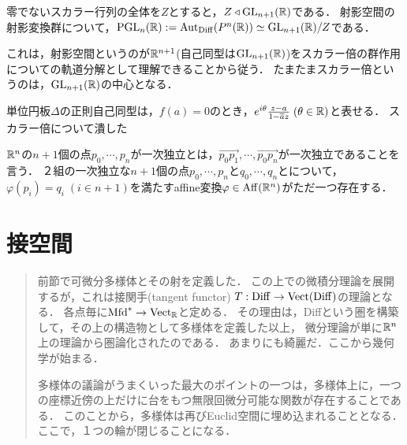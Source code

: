 \documentclass[uplatex,dvipdfmx]{jsreport}
\begin{document}
\begin{proposition}[射影変換群の構造]
    零でないスカラー行列の全体を$Z$とすると，$Z\triangleleft\mathrm{GL}_{n+1}(\mathbb{R})$である．
    射影空間の射影変換群について，$\mathrm{PGL}_n(\mathbb{R}):=\mathrm{Aut}_{\mathrm{Diff}}(P^n(\mathbb{R}))\simeq\mathrm{GL}_{n+1}(\mathbb{R})/Z$である．
\end{proposition}
\begin{remarks}
    これは，射影空間というのが$\mathbb{R}^{n+1}$(自己同型は$\mathrm{GL}_{n+1}(\mathbb{R})$)をスカラー倍の群作用についての軌道分解として理解できることから従う．
    たまたまスカラー倍というのは，$\mathrm{GL}_{n+1}(\mathbb{R})$の中心となる．

    単位円板$\Delta$の正則自己同型は，$f(a)=0$のとき，$e^{i\theta}\frac{z-a}{1-\overline{a}z}\;(\theta\in\mathbb{R})$と表せる．
    スカラー倍について潰した
\end{remarks}

\begin{proposition}[一次変換の推移性の一般化]
    $\mathbb{R}^n$の$n+1$個の点$p_0,\cdots,p_n$が一次独立とは，$\vec{p_0p_1},\cdots,\vec{p_0p_n}$が一次独立であることを言う．
    ２組の一次独立な$n+1$個の点$p_0,\cdots,p_n$と$q_0,\cdots,q_n$とについて，$\varphi(p_i)=q_i\;(i\in n+1)$を満たすaffine変換$\varphi\in\mathrm{Aff}(\mathbb{R}^n)$がただ一つ存在する．
\end{proposition}

\chapter{接空間}

\begin{quotation}
    前節で可微分多様体とその射を定義した．
    この上での微積分理論を展開するが，これは接関手(tangent functor) $T:\mathrm{Diff}\to\mathrm{Vect}(\mathrm{Diff})$の理論となる．
    各点毎に$\mathrm{Mfd}^*\to\mathrm{Vect}_{\mathbb{R}}$と定める．
    その理由は，Diffという圏を構築して，その上の構造物として多様体を定義した以上，
    微分理論が単に$\mathbb{R}^n$上の理論から圏論化されたのである．
    あまりにも綺麗だ．ここから幾何学が始まる．

    多様体の議論がうまくいった最大のポイントの一つは，多様体上に，一つの座標近傍の上だけに台をもつ無限回微分可能な関数が存在することである．
    このことから，多様体は再びEuclid空間に埋め込まれることとなる．ここで，１つの輪が閉じることになる．
\end{quotation}
\end{document}
